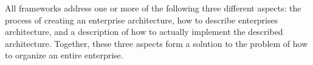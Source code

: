 All frameworks address one or more of the following three different aspects: the process of creating an enterprise architecture, how to describe enterprises architecture, and a description of how to actually implement the described architecture. Together, these three aspects form a solution to the problem of how to organize an entire enterprise.


